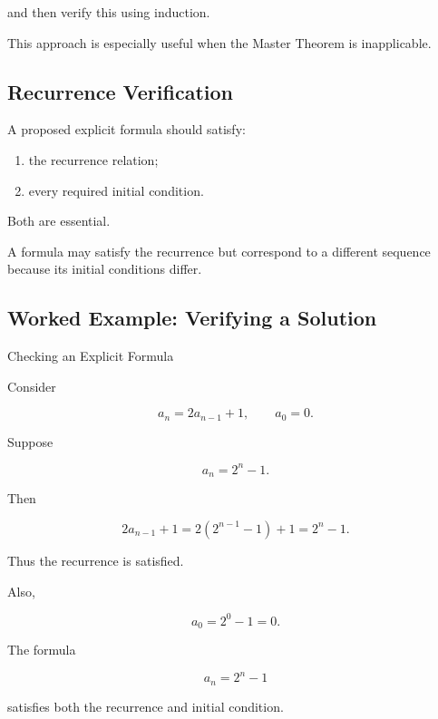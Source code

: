 and then verify this using induction.

This approach is especially useful when the Master Theorem is
inapplicable.

\subsection{Recurrence Verification}
\label{subsec:recurrence-verification}

A proposed explicit formula should satisfy:

\begin{enumerate}
    \item the recurrence relation;
    \item every required initial condition.
\end{enumerate}

Both are essential.

A formula may satisfy the recurrence but correspond to a different
sequence because its initial conditions differ.

\subsection{Worked Example: Verifying a Solution}
\label{subsec:worked-verify-recurrence}

\begin{workedexamplebox}{Checking an Explicit Formula}

Consider

\[
a_n=2a_{n-1}+1,
\qquad
a_0=0.
\]

Suppose

\[
a_n=2^n-1.
\]

Then

\[
2a_{n-1}+1
=
2(2^{n-1}-1)+1
=
2^n-1.
\]

Thus the recurrence is satisfied.

Also,

\[
a_0
=
2^0-1
=
0.
\]

\begin{answerbox}
The formula

\[
\boxed{
a_n=2^n-1
}
\]

satisfies both the recurrence and initial condition.
\end{answerbox}

\end{workedexamplebox}

